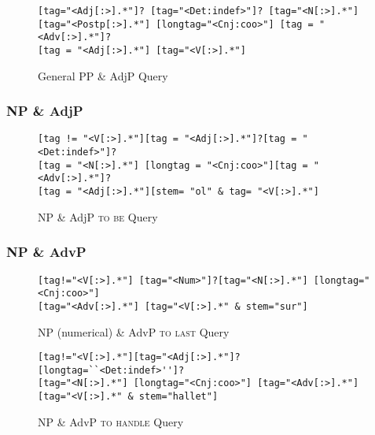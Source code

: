 \begin{figure}[!h]
	\begin{lstlisting}
[tag="<Adj[:>].*"]? [tag="<Det:indef>"]? [tag="<N[:>].*"]
[tag="<Postp[:>].*"] [longtag="<Cnj:coo>"] [tag = "<Adv[:>].*"]?
[tag = "<Adj[:>].*"] [tag="<V[:>].*"]
	\end{lstlisting}
	\caption{General PP \& AdjP Query}
	\label{CQl_pp-adjpgeneral}
\end{figure}


\subsubsection{NP \& AdjP}

\begin{figure}[!h]
	\begin{lstlisting}
[tag != "<V[:>].*"][tag = "<Adj[:>].*"]?[tag = "<Det:indef>"]?
[tag = "<N[:>].*"] [longtag = "<Cnj:coo>"][tag = "<Adv[:>].*"]?
[tag = "<Adj[:>].*"][stem= "ol" & tag= "<V[:>].*"]
	\end{lstlisting}
	\caption{NP \& AdjP \textsc{to be} Query}
	\label{CQl_np-adjptobe}
\end{figure}

\subsubsection{NP \& AdvP}

\begin{figure}[!h]
	\begin{lstlisting}
[tag!="<V[:>].*"] [tag="<Num>"]?[tag="<N[:>].*"] [longtag="<Cnj:coo>"] 
[tag="<Adv[:>].*"] [tag="<V[:>].*" & stem="sur"]
	\end{lstlisting}
	\caption{NP (numerical) \& AdvP \textsc{to last} Query}
	\label{CQl_np-advplast}
\end{figure}

\begin{figure}[!h]
	\begin{lstlisting}
[tag!="<V[:>].*"][tag="<Adj[:>].*"]? [longtag=``<Det:indef>'']?
[tag="<N[:>].*"] [longtag="<Cnj:coo>"] [tag="<Adv[:>].*"]
[tag="<V[:>].*" & stem="hallet"] 
	\end{lstlisting}
	\caption{NP \& AdvP \textsc{to handle} Query}
	\label{CQl_np-advphallet}
\end{figure}

